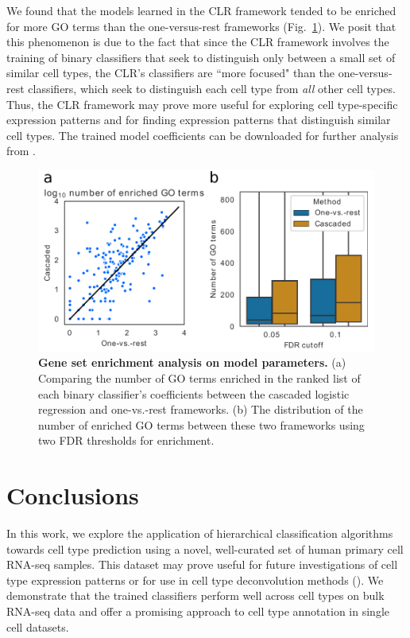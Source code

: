 We found that the models learned in the CLR framework tended to be enriched for more GO terms than the one-versus-rest frameworks (Fig.~\ref{fig:compare_go_enrichment}). We posit that this phenomenon is due to the fact that since the CLR framework involves the training of binary classifiers that seek to distinguish only between a small set of similar cell types, the CLR's classifiers are ``more focused" than the one-versus-rest classifiers, which seek to distinguish each cell type from \textit{all} other cell types.  Thus, the CLR framework may prove more useful for exploring cell type-specific expression patterns and for finding expression patterns that distinguish similar cell types.  The trained model coefficients can be downloaded for further analysis from \DataDownloadURL{}.

 \begin{figure}[h!]
    \centerline{\includegraphics[width=13cm]{figures/GO_enrichment_figure}}
    \caption{\textbf{Gene set enrichment analysis on model parameters.} (a) Comparing the number of GO terms enriched in the ranked list of each binary classifier's coefficients between the cascaded logistic regression and one-vs.-rest frameworks. (b) The distribution of the number of enriched GO terms between these two frameworks using two FDR thresholds for enrichment.}
    \label{fig:compare_go_enrichment}
      \end{figure}



\section{Conclusions}

In this work, we explore the application of hierarchical classification algorithms towards cell type prediction using a novel, well-curated set of human primary cell RNA-seq samples. This dataset may prove useful for future investigations of cell type expression patterns or for use in cell type deconvolution methods (\citealp{Aran2017, Newman2015}). We demonstrate that the trained classifiers perform well across cell types on bulk RNA-seq data and offer a promising approach to cell type annotation in single cell datasets.  

